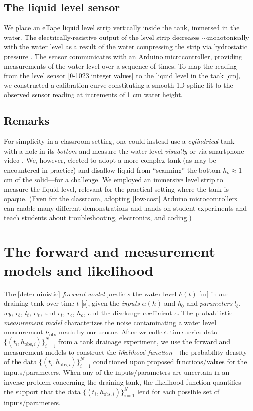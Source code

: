 \documentclass[a4paper,fleqn]{cas-dc}
\newcommand\thedata {$\{(t_i,h_{\text{obs}, i})\}_{i=1}^{N}$\xspace}
\begin{document}
\subsection{The liquid level sensor}
We place an eTape\texttrademark\xspace liquid level strip vertically inside the tank, immersed in the water. 
The electrically-resistive output of the level strip decreases $\sim$monotonically with the water level as a result of the water compressing the strip via hydrostatic pressure \cite{eTape}.
The sensor communicates with an Arduino microcontroller, providing measurements of the water level over a sequence of times. 
To map the reading from the level sensor [0-1023 integer values] to the liquid level in the tank [cm], we constructed a calibration curve constituting a smooth 1D spline fit to the observed sensor reading at increments of 1 cm water height.

\subsection{Remarks}
For simplicity in a classroom setting, one could instead use a \emph{cylindrical} tank with a hole in its \emph{bottom} and measure the water level \emph{visually} or via smartphone video \cite{brown2009innovative,klein2015video}. We, however, elected to adopt a more complex tank (as may be encountered in practice) and disallow liquid from ``scanning'' the bottom $h_o \approx 1$\,cm of the solid---for a challenge. We employed an immersive level strip to measure the liquid level, relevant for the practical setting where the tank is opaque. (Even for the classroom, adopting [low-cost] Arduino microcontrollers can enable many different demonstrations and hands-on student experiments \cite{kubinova2015chemduino,kang2019applying,Pino2018} and teach students about troubleshooting, electronics, and coding.) 


\section{The forward and measurement models and likelihood}
The [deterministic] \emph{forward model} predicts the water level $h(t)$ [m] in our draining tank over time $t$ [s], given the \emph{inputs} $\alpha(h)$ and $h_0$ and \emph{parameters}  $l_b$, $w_b$, $r_b$, $l_t$, $w_t$, and $r_t$, $r_o$, $h_o$, and the discharge coefficient $c$. 
The probabilistic \emph{measurement model} characterizes the noise contaminating a water level measurement $h_{\text{obs}}$ made by our sensor.
After we collect time series data \thedata from a tank drainage experiment, we use the forward and measurement models to construct the \emph{likelihood function}---the probability density of the data \thedata conditioned upon proposed functions/values for the inputs/parameters. 
When any of the inputs/parameters are uncertain in an inverse problem concerning the draining tank, the likelihood function quantifies the support that the data \thedata lend for each possible set of inputs/parameters.
\end{document}
